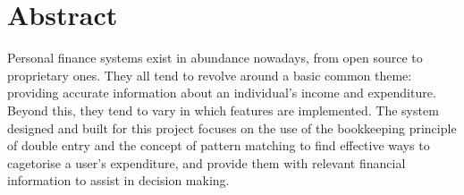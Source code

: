 \section{Abstract} \label{sec:Abstract}
Personal finance systems exist in abundance nowadays, from open source to
proprietary ones. They all tend to revolve around a basic common theme:
providing accurate information about an individual's income and expenditure.
Beyond this, they tend to vary in which features are implemented. The system
designed and built for this project focuses on the use of the bookkeeping
principle of double entry and the concept of pattern matching to find effective
ways to cagetorise a user's expenditure, and provide them with relevant
financial information to assist in decision making.
